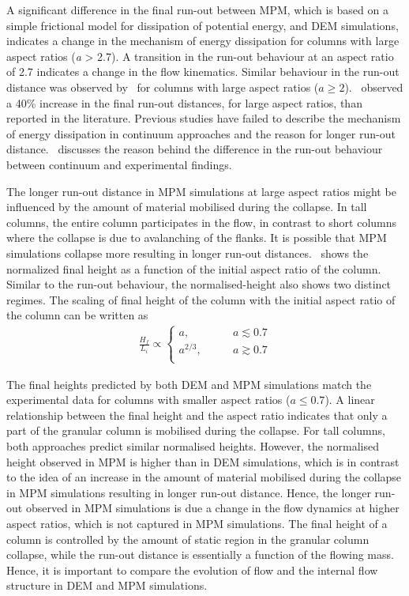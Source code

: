 A significant difference in the final run-out between MPM, which is based on a 
simple frictional model for dissipation of potential energy, and DEM 
simulations, indicates a change in the mechanism of energy 
dissipation for columns with large aspect ratios (\textit{a} > 
2.7). A transition in the run-out behaviour at an aspect ratio of 2.7 indicates 
a change in the flow kinematics. Similar behaviour in the run-out distance was 
observed by~\citet{Bandara2013} for columns with large aspect ratios ($a \ge 
2$).~\citet{Mast2014} observed a 40\% increase in the final run-out distances, 
for large aspect ratios, than reported in the literature. Previous studies have 
failed to describe the mechanism of energy dissipation in continuum approaches 
and the reason for longer run-out distance.~ discusses the 
reason behind the difference in the run-out behaviour between continuum and 
experimental findings.

The longer run-out distance in MPM simulations at large aspect ratios might be 
influenced by the amount of material mobilised during the collapse. In tall 
columns, the entire column participates in the flow, in contrast to short 
columns where the collapse is due to avalanching of the flanks. It is possible 
that MPM simulations collapse more resulting in longer run-out 
distances.~ shows the normalized final height as a function of 
the initial aspect ratio of the column. Similar to the run-out behaviour, the 
normalised-height also shows two distinct regimes. The scaling of final height 
of the column with the initial aspect ratio of the column can be written as
\begin{align}
\frac{H_{{f}}}{L_{{i}}} \propto  
\begin{cases}
\textit{a}, \qquad & \textit{a}\lesssim0.7 \\
\textit{a}^{2/3}, \qquad & \textit{a}\gtrsim0.7 \\
\end{cases}
\end{align} 

The final heights predicted by both DEM and MPM simulations match the 
experimental data for columns with smaller aspect ratios ($a \le 0.7$). A 
linear relationship between the final height and the aspect ratio indicates 
that only a part of the granular column is mobilised during the collapse. For 
tall columns, both approaches predict similar normalised heights. However, the 
normalised height observed in MPM is higher than in DEM simulations, which is 
in contrast to the idea of an increase in the amount of material mobilised 
during the collapse in MPM simulations resulting in longer run-out distance. 
Hence, the longer run-out observed in MPM simulations is due a change in the 
flow dynamics at higher aspect ratios, which is not captured in MPM 
simulations. The final height of a column is controlled by the amount of static 
region in the granular column collapse, while the run-out distance is 
essentially a function of the flowing mass. Hence, it is important to compare 
the evolution of flow and the internal flow structure in DEM and MPM 
simulations.

